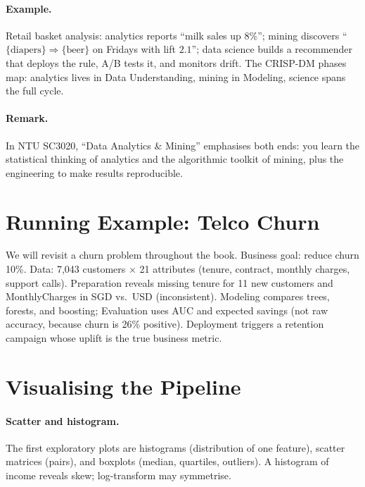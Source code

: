\paragraph{Example.} Retail basket analysis: analytics reports ``milk sales up 8\%''; mining discovers ``$\{\text{diapers}\}\Rightarrow\{\text{beer}\}$ on Fridays with lift $2.1$''; data science builds a recommender that deploys the rule, A/B tests it, and monitors drift. The CRISP-DM phases map: analytics lives in Data Understanding, mining in Modeling, science spans the full cycle.

\paragraph{Remark.} In NTU SC3020, ``Data Analytics \& Mining'' emphasises both ends: you learn the statistical thinking of analytics and the algorithmic toolkit of mining, plus the engineering to make results reproducible.

\section{Running Example: Telco Churn}
\label{sec:telco-example}
We will revisit a churn problem throughout the book. Business goal: reduce churn 10\%. Data: 7,043 customers $\times$ 21 attributes (tenure, contract, monthly charges, support calls). Preparation reveals missing tenure for 11 new customers and MonthlyCharges in SGD vs.\ USD (inconsistent). Modeling compares trees, forests, and boosting; Evaluation uses AUC and expected savings (not raw accuracy, because churn is 26\% positive). Deployment triggers a retention campaign whose uplift is the true business metric.

\section{Visualising the Pipeline}
\label{sec:viz-pipeline}
\paragraph{Scatter and histogram.} The first exploratory plots are histograms (distribution of one feature), scatter matrices (pairs), and boxplots (median, quartiles, outliers). A histogram of income reveals skew; log-transform may symmetrise.

